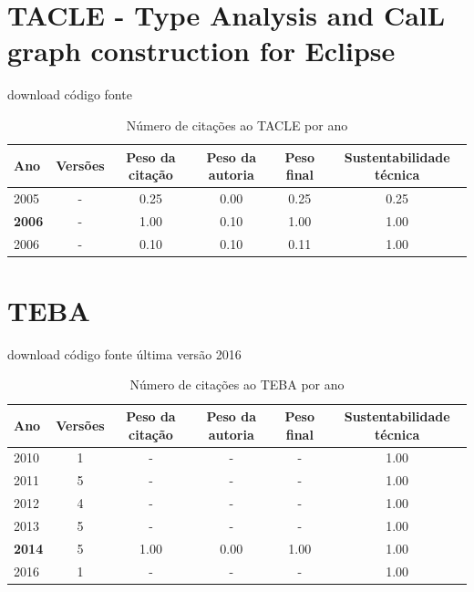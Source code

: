 \section{TACLE - Type Analysis and CalL graph construction for Eclipse}
\checkmark download
\checkmark código fonte


\begin{table}[H]
\caption{Número de citações ao TACLE  por ano}
\centering
\begin{tabular}{| l | c | c | c | c | c |}
  \hline
  Ano & Versões & Peso da citação & Peso da autoria & Peso final & Sustentabilidade técnica \\
  \hline
            2005
          &
          -
          &
          0.25
          &
          0.00
          &
          0.25
          &
            {\color{red} 0.25}
          \\
\hline
            {\bf 2006}
          &
          -
          &
          1.00
          &
          0.10
          &
          1.00
          &
            {\color{blue} 1.00}
          \\
            2006
          &
          -
          &
          0.10
          &
          0.10
          &
          0.11
          &
            {\color{blue} 1.00}
          \\
\hline
\end{tabular}
\end{table}



\section{TEBA}
\checkmark download
\checkmark código fonte
\checkmark última versão 2016


\begin{table}[H]
\caption{Número de citações ao TEBA por ano}
\centering
\begin{tabular}{| l | c | c | c | c | c |}
  \hline
  Ano & Versões & Peso da citação & Peso da autoria & Peso final & Sustentabilidade técnica \\
  \hline
        2010 & 1 & - & - & -
        &
          {\color{blue} 1.00}
        \\
\hline
        2011 & 5 & - & - & -
        &
          {\color{blue} 1.00}
        \\
\hline
        2012 & 4 & - & - & -
        &
          {\color{blue} 1.00}
        \\
\hline
        2013 & 5 & - & - & -
        &
          {\color{blue} 1.00}
        \\
\hline
            {\bf 2014}
          &
          5
          &
          1.00
          &
          0.00
          &
          1.00
          &
            {\color{blue} 1.00}
          \\
\hline
        2016 & 1 & - & - & -
        &
          {\color{blue} 1.00}
        \\
\hline
\end{tabular}
\end{table}



